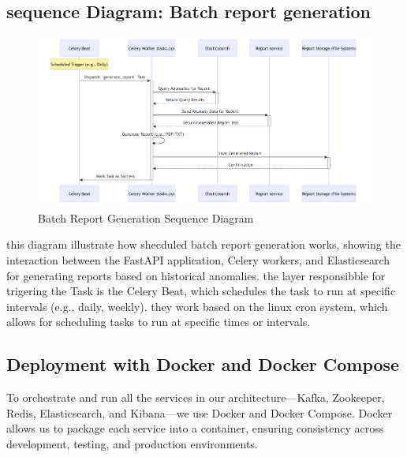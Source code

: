 \subsection{sequence Diagram: Batch report generation}
\begin{figure}[H]
    
    \includegraphics[width=1.2\textwidth]{figures/batch-1.png}
    \caption{Batch Report Generation Sequence Diagram}
    \label{fig:batch_report_generation_sequence_diagram}


\end{figure}


this diagram illustrate how shecduled batch report generation works, showing the interaction between the FastAPI application, Celery workers, and Elasticsearch for generating reports based on historical anomalies.
the layer responsibble for trigering the Task is the Celery Beat, which schedules the task to run at specific intervals (e.g., daily, weekly).
they work based on the linux cron system, which allows for scheduling tasks to run at specific times or intervals.

\subsection{Deployment with Docker and Docker Compose}

To orchestrate and run all the services in our architecture—Kafka, Zookeeper, Redis, Elasticsearch, and Kibana—we use Docker and Docker Compose. Docker allows us to package each service into a container, ensuring consistency across development, testing, and production environments.

